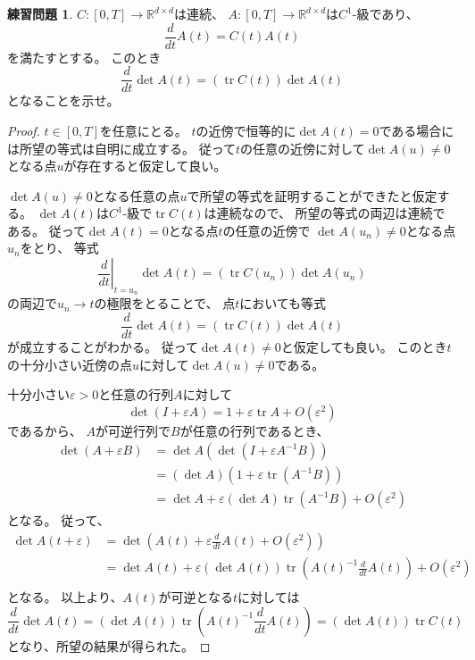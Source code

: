 \documentclass[uplatex]{jsarticle}
\theoremstyle{definition}
\newtheorem{prob}[prob]{練習問題}
\def\ep{\varepsilon}
\DeclareMathOperator{\tr}{\mathrm{tr}}
\def\R{\mathbb{R}}
\begin{document}
\begin{prob}\label{prob: 5.6}
  \(C:[0,T]\to \R^{d\times d}\)は連続、
  \(A:[0,T]\to \R^{d\times d}\)は\(C^1\)-級であり、
  \[
  \frac{d}{dt}A(t) = C(t)A(t)
  \]
  を満たすとする。
  このとき
  \[
  \frac{d}{dt}\det A(t) = \left( \tr C(t) \right) \det A(t)
  \]
  となることを示せ。
\end{prob}

\begin{proof}
  \(t\in [0,T]\)を任意にとる。
  \(t\)の近傍で恒等的に\(\det A(t) = 0\)である場合には所望の等式は自明に成立する。
  従って\(t\)の任意の近傍に対して\(\det A(u) \neq 0\)となる点\(u\)が存在すると仮定して良い。

  \(\det A(u)\neq 0\)となる任意の点\(u\)で所望の等式を証明することができたと仮定する。
  \(\det A(t)\)は\(C^1\)-級で\(\tr C(t)\)は連続なので、
  所望の等式の両辺は連続である。
  従って\(\det A(t) = 0\)となる点\(t\)の任意の近傍で
  \(\det A(u_n) \neq 0\)となる点\(u_n\)をとり、
  等式
  \[
  \left.\frac{d}{dt}\right|_{t=u_n}\det A(t)
  = \left( \tr C(u_n)\right) \det A(u_n)
  \]
  の両辺で\(u_n\to t\)の極限をとることで、
  点\(t\)においても等式
  \[
  \frac{d}{dt}\det A(t)
  = \left( \tr C(t)\right) \det A(t)
  \]
  が成立することがわかる。
  従って\(\det A(t) \neq 0\)と仮定しても良い。
  このとき\(t\)の十分小さい近傍の点\(u\)に対して\(\det A(u) \neq 0\)である。

  十分小さい\(\ep>0\)と任意の行列\(A\)に対して
  \[
  \det (I+\ep A) = 1 + \ep \tr A + O(\ep^2)
  \]
  であるから、
  \(A\)が可逆行列で\(B\)が任意の行列であるとき、
  \begin{align*}
    \det (A+\ep B) &= \det A \left( \det (I + \ep A^{-1}B)\right) \\
    &= \left(\det A\right) \left( 1+\ep \tr(A^{-1}B)\right) \\
    &= \det A + \ep \left( \det A\right) \tr (A^{-1}B) + O(\ep^2)
  \end{align*}
  となる。
  従って、
  \begin{align*}
    \det A(t+\ep)
    &= \det \left( A(t) + \ep\frac{d}{dt}A(t) + O(\ep^2)\right) \\
    &= \det A(t)
    + \ep \left( \det A(t) \right) \tr \left( A(t)^{-1}\frac{d}{dt}A(t)\right)
    + O(\ep^2) \\
  \end{align*}
  となる。
  以上より、\(A(t)\)が可逆となる\(t\)に対しては
  \[
  \frac{d}{dt} \det A(t)
  = \left( \det A(t) \right) \tr \left( A(t)^{-1}\frac{d}{dt}A(t)\right)
  = \left( \det A(t) \right) \tr C(t)
  \]
  となり、所望の結果が得られた。


\end{proof}
\end{document}
